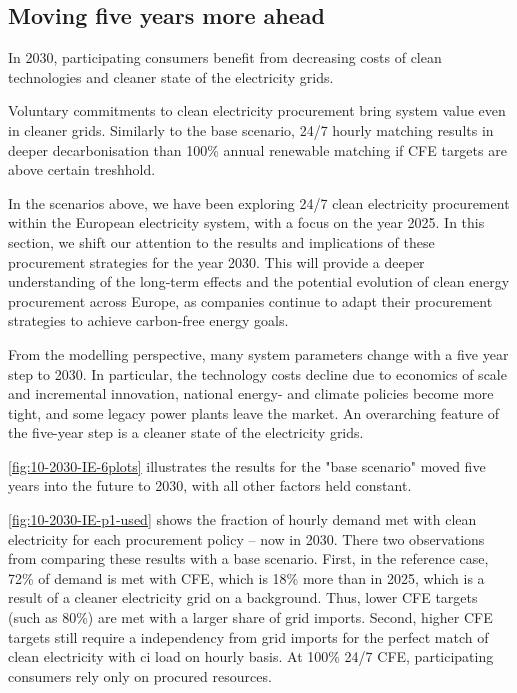 \subsection{Moving five years more ahead}
\label{subsec:time}

\vspace{10pt}
\begin{res}
    In 2030, participating consumers benefit from decreasing costs of clean technologies and cleaner state of the electricity grids.
\end{res}

\vspace{5pt}
\begin{res}
    Voluntary commitments to clean electricity procurement bring system value even in
    cleaner grids. Similarly to the base scenario, 24/7 hourly matching results in deeper decarbonisation than 100\% annual renewable matching if CFE targets are above certain treshhold.
\end{res}

In the scenarios above, we have been exploring 24/7 clean electricity procurement within the European electricity system, with a focus on the year 2025. 
In this section, we shift our attention to the results and implications of these procurement strategies for the year 2030. 
This will provide a deeper understanding of the long-term effects and the potential evolution of clean energy procurement across Europe, as companies continue to adapt their procurement strategies to achieve carbon-free energy goals.

From the modelling perspective, many system parameters change with a five year step to 2030. 
In particular, the technology costs decline due to economics of scale and incremental innovation, national energy- and climate policies become more tight, and some legacy power plants leave the market. 
An overarching feature of the five-year step is a cleaner state of the electricity grids.

\cref{fig:10-2030-IE-6plots} illustrates the results for the "base scenario" moved five years into the future to 2030, with all other factors held constant. 

\cref{fig:10-2030-IE-p1-used} shows the fraction of hourly demand met with clean electricity for each procurement policy -- now in 2030. 
There two observations from comparing these results with a base scenario.
First, in the reference case, 72\% of demand is met with CFE, which is 18\% more than in 2025, which is a result of a cleaner electricity grid on a background. 
Thus, lower CFE targets (such as 80\%) are met with a larger share of grid imports. 
Second, higher CFE targets still require a independency from grid imports for the perfect match of clean electricity with \gls{ci} load on hourly basis. 
At 100\% 24/7 CFE, participating consumers rely only on procured resources.

